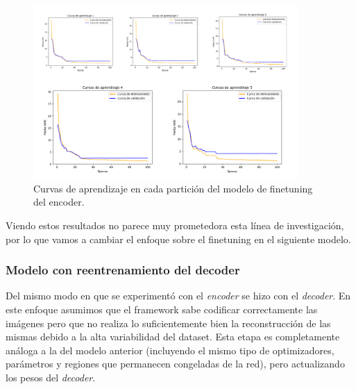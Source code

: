         \begin{figure}[!h]
            \centering
            \includegraphics[width=0.9\textwidth]{img/curvas_encoder.png}
            \caption{Curvas de aprendizaje en cada partición del modelo de finetuning del encoder.}
            \label{fig:curvas_encoder}
        \end{figure}

        \medskip

        \noindent Viendo estos resultados no parece muy prometedora esta línea de investigación, por lo que vamos a cambiar el enfoque sobre el finetuning en el siguiente modelo.

        \subsubsection{Modelo con reentrenamiento del decoder}
            \noindent Del mismo modo en que se experimentó con el \textit{encoder} se hizo con el \textit{decoder}. En este enfoque asumimos que el framework sabe codificar correctamente las imágenes pero que no realiza lo suficientemente bien la reconstrucción de las mismas debido a la alta variabilidad del dataset. Esta etapa es completamente análoga a la del modelo anterior (incluyendo el mismo tipo de optimizadores, parámetros y regiones que permanecen congeladas de la red), pero actualizando los pesos del \textit{decoder}.

